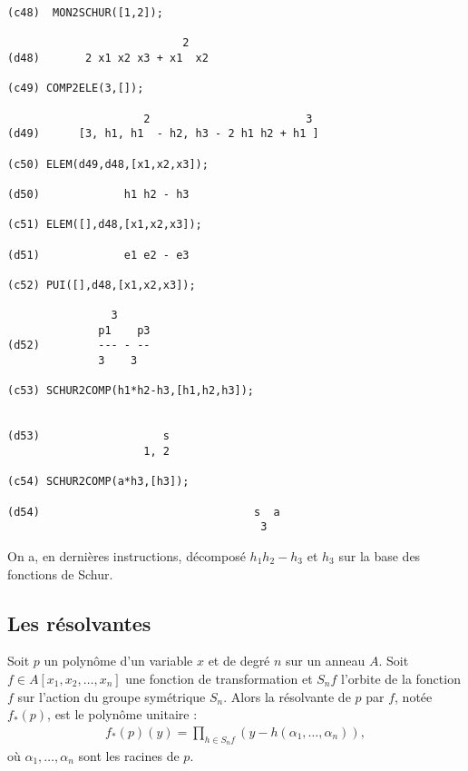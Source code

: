 \begin{verbatim}
(c48)  MON2SCHUR([1,2]);

                           2
(d48)       2 x1 x2 x3 + x1  x2

(c49) COMP2ELE(3,[]);

                     2                        3
(d49)      [3, h1, h1  - h2, h3 - 2 h1 h2 + h1 ]

(c50) ELEM(d49,d48,[x1,x2,x3]);

(d50)             h1 h2 - h3

(c51) ELEM([],d48,[x1,x2,x3]);

(d51)             e1 e2 - e3

(c52) PUI([],d48,[x1,x2,x3]);

                3
              p1    p3
(d52)         --- - --
              3    3

(c53) SCHUR2COMP(h1*h2-h3,[h1,h2,h3]);


(d53) 				    s	  
				     1, 2

(c54) SCHUR2COMP(a*h3,[h3]);

(d54)                                 s  a
                                       3

\end{verbatim}
\normalsize
On a, en derni\`eres instructions, d\'ecompos\'e $h_{1}h_{2}-h_{3}$ 
et $h_{3}$ sur la base des fonctions de Schur.
\subsection{Les r\'esolvantes}
  Soit $p$ un polyn\^ome d'un variable $x$ et de degr\'e $n$ sur un
anneau $A$.
Soit $f \in A[x_1,x_2,\ldots ,x_n]$ une fonction de transformation et
$S_nf$ l'orbite de la fonction $f$ sur l'action du groupe sym\'etrique
$S_n$. Alors la r\'esolvante de $p$ par $f$, not\'ee $f_*(p)$,
est le polyn\^ome unitaire :
\begin{eqnarray*}
f_*(p)(y) = \prod_{h\in S_nf} (y- h(\alpha_1,\ldots ,\alpha_n)),
\end{eqnarray*}
o\`u $\alpha_1,\ldots ,\alpha_n$ sont les racines de $p$.\\

